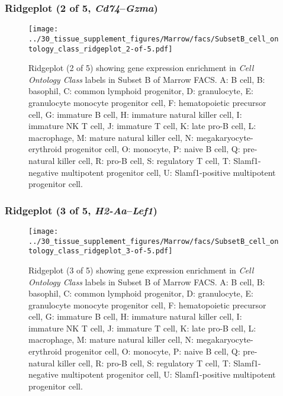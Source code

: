 \subsubsection{Ridgeplot (2 of 5, \emph{Cd74}--\emph{Gzma})}
\begin{figure}[h]
\centering
\texttt{[image: ../30\_tissue\_supplement\_figures/Marrow/facs/SubsetB\_cell\_ontology\_class\_ridgeplot\_2-of-5.pdf]}

\caption{ Ridgeplot (2 of 5)  showing gene expression enrichment in \emph{Cell Ontology Class} labels in Subset B of Marrow FACS. A: B cell, B: basophil, C: common lymphoid progenitor, D: granulocyte, E: granulocyte monocyte progenitor cell, F: hematopoietic precursor cell, G: immature B cell, H: immature natural killer cell, I: immature NK T cell, J: immature T cell, K: late pro-B cell, L: macrophage, M: mature natural killer cell, N: megakaryocyte-erythroid progenitor cell, O: monocyte, P: naive B cell, Q: pre-natural killer cell, R: pro-B cell, S: regulatory T cell, T: Slamf1-negative multipotent progenitor cell, U: Slamf1-positive multipotent progenitor cell.}
\end{figure}


\clearpage

\subsubsection{Ridgeplot (3 of 5, \emph{H2-Aa}--\emph{Lef1})}
\begin{figure}[h]
\centering
\texttt{[image: ../30\_tissue\_supplement\_figures/Marrow/facs/SubsetB\_cell\_ontology\_class\_ridgeplot\_3-of-5.pdf]}

\caption{ Ridgeplot (3 of 5)  showing gene expression enrichment in \emph{Cell Ontology Class} labels in Subset B of Marrow FACS. A: B cell, B: basophil, C: common lymphoid progenitor, D: granulocyte, E: granulocyte monocyte progenitor cell, F: hematopoietic precursor cell, G: immature B cell, H: immature natural killer cell, I: immature NK T cell, J: immature T cell, K: late pro-B cell, L: macrophage, M: mature natural killer cell, N: megakaryocyte-erythroid progenitor cell, O: monocyte, P: naive B cell, Q: pre-natural killer cell, R: pro-B cell, S: regulatory T cell, T: Slamf1-negative multipotent progenitor cell, U: Slamf1-positive multipotent progenitor cell.}
\end{figure}


\clearpage


